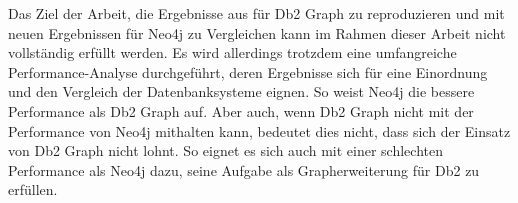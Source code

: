 Das Ziel der Arbeit, die Ergebnisse aus \cite{sigmod_tian} für Db2 Graph zu reproduzieren und mit neuen Ergebnissen für Neo4j zu Vergleichen kann im Rahmen dieser Arbeit nicht vollständig erfüllt werden. Es wird allerdings trotzdem eine umfangreiche Performance-Analyse durchgeführt, deren Ergebnisse sich für eine Einordnung und den Vergleich der Datenbanksysteme eignen. So weist Neo4j die bessere Performance als Db2 Graph auf. Aber auch, wenn Db2 Graph nicht mit der Performance von Neo4j mithalten kann, bedeutet dies nicht, dass sich der Einsatz von Db2 Graph nicht lohnt. So eignet es sich auch mit einer schlechten Performance als Neo4j dazu, seine Aufgabe als Grapherweiterung für Db2 zu erfüllen.  

\listoftodos
